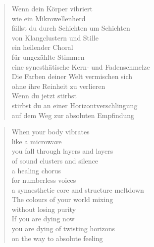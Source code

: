 
\cleartoverso


\begin{verse}

Wenn dein Körper vibriert\\
wie ein Mikrowellenherd\\
fällst du durch Schichten um Schichten\\
von Klangclustern und Stille\\
ein heilender Choral\\
für ungezählte Stimmen\\
eine synesthätische Kern- und Fadenschmelze\\
Die Farben deiner Welt vermischen sich\\
ohne ihre Reinheit zu verlieren\\
Wenn du jetzt stirbst\\
stirbst du an einer Horizontverschlingung\\
auf dem Weg zur absoluten Empfindung

\end{verse}

\clearpage


\begin{verse}

When your body vibrates\\
like a microwave\\
you fall through layers and layers\\
of sound clusters and silence\\
a healing chorus\\
for numberless voices\\
a synaesthetic core and structure meltdown\\
The colours of your world mixing\\
without losing purity\\
If you are dying now\\
you are dying of twisting horizons\\
on the way to absolute feeling

\end{verse}
